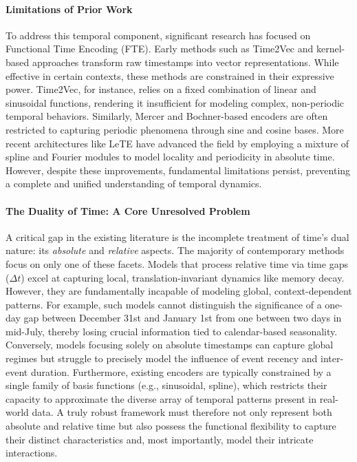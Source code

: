 \documentclass{article}
\begin{document}
\paragraph{Limitations of Prior Work}
To address this temporal component, significant research has focused on Functional Time Encoding (FTE). Early methods such as Time2Vec \cite{kazemi2019time2vec} and kernel-based approaches \cite{xu2019functional} transform raw timestamps into vector representations. While effective in certain contexts, these methods are constrained in their expressive power. Time2Vec, for instance, relies on a fixed combination of linear and sinusoidal functions, rendering it insufficient for modeling complex, non-periodic temporal behaviors. Similarly, Mercer and Bochner-based encoders are often restricted to capturing periodic phenomena through sine and cosine bases. More recent architectures like LeTE \cite{lete_placeholder} have advanced the field by employing a mixture of spline and Fourier modules to model locality and periodicity in absolute time. However, despite these improvements, fundamental limitations persist, preventing a complete and unified understanding of temporal dynamics.

\paragraph{The Duality of Time: A Core Unresolved Problem}
A critical gap in the existing literature is the incomplete treatment of time's dual nature: its \textit{absolute} and \textit{relative} aspects. The majority of contemporary methods focus on only one of these facets. Models that process relative time via time gaps ($\Delta t$) excel at capturing local, translation-invariant dynamics like memory decay. However, they are fundamentally incapable of modeling global, context-dependent patterns. For example, such models cannot distinguish the significance of a one-day gap between December 31st and January 1st from one between two days in mid-July, thereby losing crucial information tied to calendar-based seasonality. Conversely, models focusing solely on absolute timestamps can capture global regimes but struggle to precisely model the influence of event recency and inter-event duration. Furthermore, existing encoders are typically constrained by a single family of basis functions (e.g., sinusoidal, spline), which restricts their capacity to approximate the diverse array of temporal patterns present in real-world data. A truly robust framework must therefore not only represent both absolute and relative time but also possess the functional flexibility to capture their distinct characteristics and, most importantly, model their intricate interactions.
\end{document}
